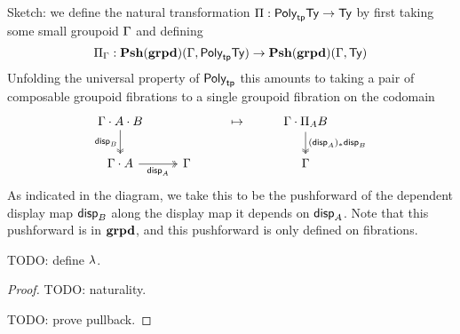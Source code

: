 \begin{defn}
  Sketch: we define the natural transformation
  $\Pi : \textsf{Poly}_{\mathsf{tp}} \mathsf{Ty} \to \mathsf{Ty}$
  by first taking some small groupoid $\Gamma$ and defining
  \[\Pi_{\Gamma} : \mathbf{Psh}(\mathbf{grpd})(\Gamma, \textsf{Poly}_{\mathsf{tp}} \mathsf{Ty}) \to \mathbf{Psh}(\mathbf{grpd})(\Gamma, \mathsf{Ty})\]
  Unfolding the universal property of $\textsf{Poly}_{\mathsf{tp}}$
  this amounts to taking a pair of composable groupoid fibrations
  to a single groupoid fibration on the codomain
  \[\begin{tikzcd}
    {\Ga \cdot A \cdot B} && \mapsto & {\Ga \cdot \Pi_AB} \\
    {\Ga \cdot A} & \Ga && \Ga
    \arrow["{\disp{B}}"', two heads, from=1-1, to=2-1]
    \arrow["{(\disp{A})_* \disp{B}}", two heads, from=1-4, to=2-4]
    \arrow["{\disp{A}}"', two heads, from=2-1, to=2-2]
  \end{tikzcd}\]
  As indicated in the diagram, we take this to be the pushforward of the
  dependent display map $\mathsf{disp}_{B}$ along the display map it depends on $\mathsf{disp}_{A}$.
  Note that this pushforward is in $\mathbf{grpd}$,
  and this pushforward is only defined on fibrations.

  TODO: define $\lambda$.
\end{defn}
\begin{proof}
  TODO: naturality.

  TODO: prove pullback.
\end{proof}

\medskip

